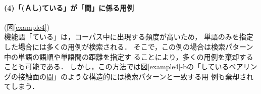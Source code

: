 \paragraph{(4)「(Ａし)ている」が「間」に係る用例}(図\ref{example4}) \\
\hspace*{1em}機能語「ている」は，コーパス中に出現する頻度が高いため，
単語のみを指定した場合には多くの用例が検索される．
そこで，この例の場合は検索パターン中の単語の語順や単語間の距離を指定す
ることにより，多くの用例を棄却することも可能である．
しかし，この方法では図\ref{example4}-bの「し\hspace{-.05em}\underline{ている}ベアリン
グの接触面の\hspace{-.05em}\underline{間}」のような構造的には検索パターンと一致する用
例も棄却されてしまう．

